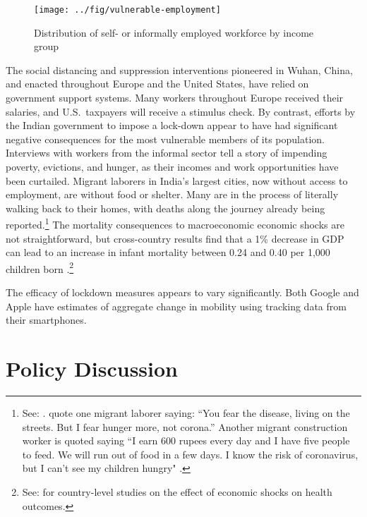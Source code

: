 \documentclass[11pt]{article}
\begin{document}
\begin{figure}
\centering
\caption{Distribution of self- or informally employed workforce by income group}
\texttt{[image: ../fig/vulnerable-employment]}
\label{fig:employment}
\end{figure}

The social distancing and suppression interventions pioneered in Wuhan, China, and enacted throughout Europe and the United States, have relied on government support systems. Many workers throughout Europe received their salaries, and U.S.\ taxpayers will receive a stimulus check. By contrast, efforts by the Indian government to impose a lock-down appear to have had significant negative consequences for the most vulnerable members of its population. Interviews with workers from the informal sector tell a story of impending poverty, evictions, and hunger, as their incomes and work opportunities have been curtailed. Migrant laborers in India's largest cities, now without access to employment, are without food or shelter. Many are in the process of literally walking back to their homes, with deaths along the journey already being reported.\footnote{
  See: \textcite{abihabib2020b,abihabib2020a,bbc2020,tewari2020}. \textcite{abihabib2020a} quote one migrant laborer saying: ``You fear the disease, living on the streets. But I fear hunger more, not corona.'' Another migrant construction worker is quoted saying ``I earn 600 rupees every day and I have five people to feed. We will run out of food in a few days. I know the risk of coronavirus, but I can't see my children hungry" \parencite{bbc2020}.}
The mortality consequences to macroeconomic economic shocks are not straightforward, but cross-country results find that a 1\% decrease in GDP can lead to an increase in infant mortality between 0.24 and 0.40 per 1,000 children born \parencite{baird2011}.\footnote{
	See: \textcite{paxson2005,cutler2002,bhalotra2010} for country-level studies on the effect of economic shocks on health outcomes.}

The efficacy of lockdown measures appears to vary significantly. Both Google and Apple have estimates of aggregate change in mobility using tracking data from their smartphones.






\section{Policy Discussion}
\end{document}

